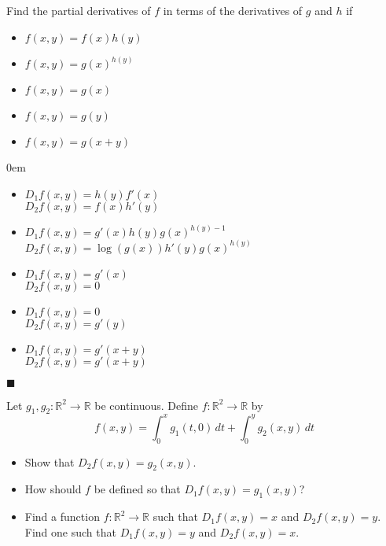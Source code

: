 \documentclass[12pt]{article}
\renewcommand{\qed}{\hfill$\blacksquare$}
\renewenvironment{proof}{\begin{addmargin}[1em]{0em}\begin{newproof}}{\end{newproof}\end{addmargin}\qed}
\newenvironment{problem}[2][Problem]{\begin{trivlist}
\item[\hskip \labelsep {\bfseries #1}\hskip \labelsep {\bfseries #2.}]}{\end{trivlist}}
\begin{document}
\begin{problem}{2.20}
Find the partial derivatives of $f$ in terms of the derivatives of $g$ and $h$  if
\begin{itemize}
	\item $f\left(x,y\right) = f\left(x\right)h\left(y\right) $
	\item $f\left(x,y\right)=g\left(x\right)^{h\left(y\right)}$
	\item $f\left(x,y\right)=g\left(x\right)$
	\item $f\left(x,y\right)=g\left(y\right)$
	\item $f\left(x,y\right)=g\left(x+y\right)$
\end{itemize}
\end{problem}
\begin{proof}
\begin{itemize}
	\item $D_1 f\left(x,y\right) = h\left(y\right)f'\left(x\right)$\\ $D_2f\left(x,y\right) = f\left(x\right)h'\left(y\right)$
	\item $D_1 f\left(x,y\right) = g'\left(x\right) h\left(y\right) g\left(x\right)^{h\left(y\right)-1}$\\ $D_2 f\left(x,y\right) = \log\left(g\left(x\right)\right) h'\left(y\right) g\left(x\right)^{h\left(y\right)}$
	\item $D_1 f\left(x,y\right) = g'\left(x\right)$\\ $D_2 f\left(x,y\right) = 0$
	\item $D_1 f\left(x,y\right) = 0$\\ $D_2 f\left(x,y\right) = g'\left(y\right)$
	\item $D_1 f\left(x,y\right) = g'\left(x+y\right)$\\ $D_2 f\left(x,y\right) = g'\left(x+y\right)$
\end{itemize}
\end{proof}



\begin{problem}{2-21}
Let $g_1,g_2:\mathbb{R}^2\rightarrow \mathbb{R}$ be continuous. Define $f:\mathbb{R}^2\rightarrow \mathbb{R}$ by $$ f\left(x,y\right) = \int_0^x g_1\left(t,0\right)\, dt + \int_0^y g_2\left(x,y\right)\, dt $$
\begin{itemize}
	\item Show that $D_2 f\left(x,y\right) = g_2 \left(x,y\right)$.
	\item How should $f$ be defined so that $D_1 f\left(x,y\right) = g_1\left(x,y\right)$?
	\item Find a function $f:\mathbb{R}^2\rightarrow \mathbb{R}$ such that $D_1 f\left(x,y\right)=x$ and $D_2f\left(x,y\right)=y$. Find one such that $D_1 f\left(x,y\right)=y$ and $D_2 f\left(x,y\right)=x$.
\end{itemize}
\end{problem}
\end{document}
